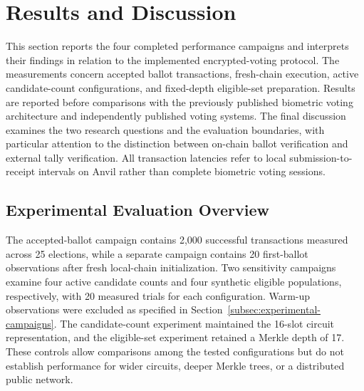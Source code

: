 
\section{Results and Discussion}
\label{sec:results-discussion}
\label{sec:07}
\label{sec:results}

This section reports the four completed performance campaigns and interprets their findings in relation to the implemented encrypted-voting protocol. The measurements concern accepted ballot transactions, fresh-chain execution, active candidate-count configurations, and fixed-depth eligible-set preparation. Results are reported before comparisons with the previously published biometric voting architecture and independently published voting systems. The final discussion examines the two research questions and the evaluation boundaries, with particular attention to the distinction between on-chain ballot verification and external tally verification. All transaction latencies refer to local submission-to-receipt intervals on Anvil rather than complete biometric voting sessions.

\subsection{Experimental Evaluation Overview}
\label{subsec:results-evaluation-overview}

The accepted-ballot campaign contains 2,000 successful transactions measured across 25 elections, while a separate campaign contains 20 first-ballot observations after fresh local-chain initialization. Two sensitivity campaigns examine four active candidate counts and four synthetic eligible populations, respectively, with 20 measured trials for each configuration. Warm-up observations were excluded as specified in Section~\ref{subsec:experimental-campaigns}. The candidate-count experiment maintained the 16-slot circuit representation, and the eligible-set experiment retained a Merkle depth of 17. These controls allow comparisons among the tested configurations but do not establish performance for wider circuits, deeper Merkle trees, or a distributed public network.

